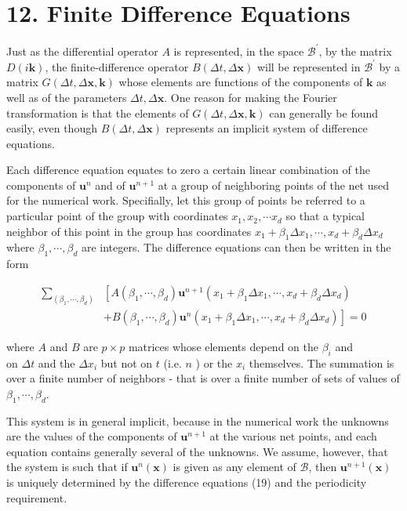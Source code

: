 \documentclass[10pt]{article}
\begin{document}
\section*{12. Finite Difference Equations}
Just as the differential operator \(A\) is represented, in the space \(\mathscr{B}^{\prime}\), by the matrix \(D(i \mathbf{k})\), the finite-difference operator \(B(\Delta t, \Delta \mathbf{x})\) will be represented in \(\mathscr{B}^{\prime}\) by a matrix \(G(\Delta t, \Delta \mathbf{x}, \mathbf{k})\) whose elements are functions of the components of \(\mathbf{k}\) as well as of the parameters \(\Delta t, \Delta \mathbf{x}\). One reason for making the Fourier transformation is that the elements of \(G(\Delta t, \Delta \mathbf{x}, \mathbf{k})\) can generally be found easily, even though \(B(\Delta t, \Delta \mathbf{x})\) represents an implicit system of difference equations.

Each difference equation equates to zero a certain linear combination of the components of \(\mathbf{u}^{n}\) and of \(\mathbf{u}^{n+1}\) at a group of neighboring points of the net used for the numerical work. Specifially, let this group of points be referred to a particular point of the group with coordinates \(x_{1}, x_{2}, \cdots x_{d}\) so that a typical neighbor of this point in the group has coordinates \(x_{1}+\beta_{1} \Delta x_{1}, \cdots, x_{d}+\beta_{d} \Delta x_{d}\) where \(\beta_{1}, \cdots, \beta_{d}\) are integers. The difference equations can then be written in the form

\[
\begin{aligned}
\sum_{\left(\beta_{1}, \cdots, \beta_{d}\right)} & {\left[A\left(\beta_{1}, \cdots, \beta_{d}\right) \mathbf{u}^{n+1}\left(x_{1}+\beta_{1} \Delta x_{1}, \cdots, x_{d}+\beta_{d} \Delta x_{d}\right)\right.} \\
& \left.+B\left(\beta_{1}, \cdots, \beta_{d}\right) \mathbf{u}^{n}\left(x_{1}+\beta_{1} \Delta x_{1}, \cdots, x_{d}+\beta_{d} \Delta x_{d}\right)\right]=0
\end{aligned}
\]

where \(A\) and \(B\) are \(p \times p\) matrices whose elements depend on the \(\beta_{i}\) and\\
on \(\Delta t\) and the \(\Delta x_{i}\) but not on \(t\) (i.e. \(n\) ) or the \(x_{i}\) themselves. The summation is over a finite number of neighbors - that is over a finite number of sets of values of \(\beta_{1}, \cdots, \beta_{d}\).

This system is in general implicit, because in the numerical work the unknowns are the values of the components of \(\mathbf{u}^{n+1}\) at the various net points, and each equation contains generally several of the unknowns. We assume, however, that the system is such that if \(\mathbf{u}^{n}(\mathbf{x})\) is given as any element of \(\mathscr{B}\), then \(\mathbf{u}^{n+1}(\mathbf{x})\) is uniquely determined by the difference equations (19) and the periodicity requirement.
\end{document}
